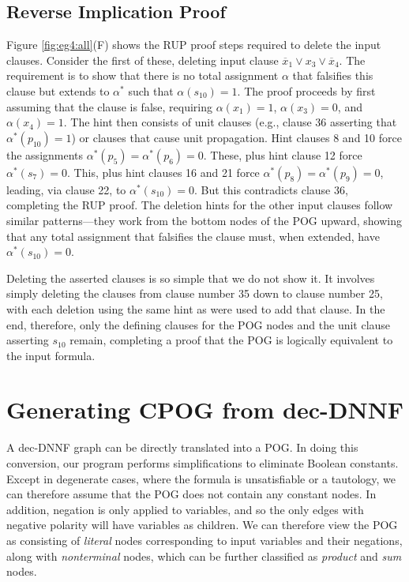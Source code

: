 \documentclass[twoside,11pt]{article}
\newcommand{\obar}[1]{\overline{#1}}
\newcommand{\extend}[1]{#1^{*}}
\newcommand{\assign}{\alpha}
\newcommand{\eassign}{\extend{\alpha}}
\newcommand{\progname}[1]{\textsc{#1}}
\newcommand{\dfour}{\progname{D4}}
\begin{document}
\subsection{Reverse Implication Proof}

Figure \ref{fig:eg4:all}(F) shows the RUP proof steps required to
delete the input clauses.  Consider the first of these, deleting
input clause $\obar{x}_1 \lor x_3 \lor \obar{x}_4$.  The requirement is to show
that there is no total assignment $\assign$ that falsifies this clause but extends to $\eassign$ such that  $\assign(s_{10}) = 1$.
The proof proceeds by first assuming that the clause is false, requiring
$\assign(x_1) = 1$, $\assign(x_3) = 0$, and $\assign(x_4) = 1$.  The hint then consists of unit
clauses (e.g., clause 36 asserting that $\eassign(p_{10}) = 1$) or
clauses that cause unit propagation.  Hint clauses 8 and 10 force the
assignments $\eassign(p_5) = \eassign(p_6) = 0$.  These, plus hint clause 12 force
$\eassign(s_7) = 0$.  This, plus hint clauses 16 and 21 force $\eassign(p_8) = \eassign(p_9) = 0$, leading,
via clause 22, to $\eassign(s_{10}) = 0$.  But this contradicts clause 36,
completing the RUP proof.  The deletion hints for the other input
clauses follow similar patterns---they work from the bottom nodes of
the POG upward, showing that any total assignment that falsifies the clause
must, when extended, have $\eassign(s_{10}) = 0$.

Deleting the asserted clauses is so simple that we do not show it.  It
involves simply deleting the clauses from clause number 35 down to
clause number 25, with each deletion using the same hint as were used
to add that clause.  In the end, therefore, only the defining clauses
for the POG nodes and the unit clause asserting $s_{10}$ remain,
completing a proof that the POG is logically equivalent to the input
formula.

\section{Generating CPOG from dec-DNNF}
\label{section:generating:cpog}

A dec-DNNF
graph can be directly translated  into a POG.
In doing this conversion,
our program performs simplifications to
eliminate Boolean constants.
Except in degenerate cases,
where the formula is unsatisfiable or a tautology,
we can therefore assume
that the POG does not contain any constant nodes.
In addition, negation is only
applied to variables, and so the only edges with negative polarity will have variables as children.
We can therefore
view the POG as consisting
of \emph{literal} nodes corresponding to input variables and their negations, along with
\emph{nonterminal} nodes, which can be further classified as \emph{product} and \emph{sum} nodes.
\end{document}
